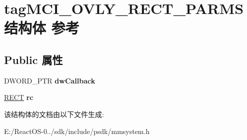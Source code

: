 \hypertarget{structtag_m_c_i___o_v_l_y___r_e_c_t___p_a_r_m_s}{}\section{tag\+M\+C\+I\+\_\+\+O\+V\+L\+Y\+\_\+\+R\+E\+C\+T\+\_\+\+P\+A\+R\+M\+S结构体 参考}
\label{structtag_m_c_i___o_v_l_y___r_e_c_t___p_a_r_m_s}
\subsection*{Public 属性}
\begin{DoxyCompactItemize}
\item 
\mbox{\label{structtag_m_c_i___o_v_l_y___r_e_c_t___p_a_r_m_s_a6497b81ade14fc801a7cbdb820c74c97}} 
D\+W\+O\+R\+D\+\_\+\+P\+TR {\bfseries dw\+Callback}
\item 
\mbox{\label{structtag_m_c_i___o_v_l_y___r_e_c_t___p_a_r_m_s_a0a87ad53342bcf959bbef9171d5917b5}} 
\hyperlink{structtag_r_e_c_t}{R\+E\+CT} {\bfseries rc}
\end{DoxyCompactItemize}


该结构体的文档由以下文件生成\+:\begin{DoxyCompactItemize}
\item 
E\+:/\+React\+O\+S-\/0../sdk/include/psdk/mmsystem.\+h\end{DoxyCompactItemize}

